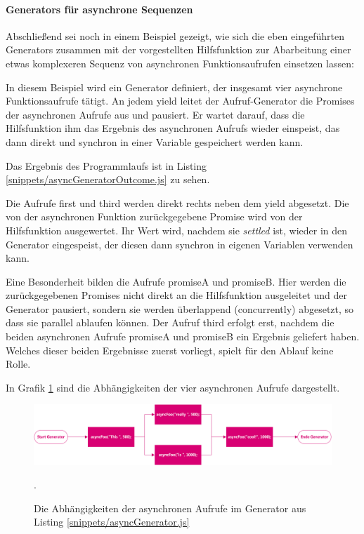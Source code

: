 \documentclass[
11pt, %
a4paper, %
oneside, %
pdfspacing, %
headinclude,
BCOR5mm, %
ngerman, %
bibtotocnumbered,
]{scrartcl}
\begin{document}
		\paragraph{Generators für asynchrone Sequenzen}
		
		Abschließend sei noch in einem Beispiel gezeigt, wie sich die eben eingeführten Generators zusammen mit der vorgestellten Hilfsfunktion zur Abarbeitung einer etwas komplexeren Sequenz von asynchronen Funktionsaufrufen einsetzen lassen:
		
		
		In diesem Beispiel wird ein Generator definiert, der insgesamt vier asynchrone Funktionsaufrufe tätigt. An jedem \textsf{yield} leitet der Aufruf-Generator die Promises der asynchronen Aufrufe aus und pausiert. Er wartet darauf, dass die Hilfsfunktion ihm das Ergebnis des asynchronen Aufrufs wieder einspeist, das dann direkt und synchron in einer Variable gespeichert werden kann. 
		
		Das Ergebnis des Programmlaufs ist in Listing \ref{snippets/asyncGeneratorOutcome.js} zu sehen.
		
		
		Die Aufrufe \textsf{first} und \textsf{third} werden direkt rechts neben dem \textsf{yield} abgesetzt. Die von der asynchronen Funktion zurückgegebene Promise wird von der Hilfsfunktion ausgewertet. Ihr Wert wird, nachdem sie \emph{settled} ist, wieder in den Generator eingespeist, der diesen dann synchron in eigenen Variablen verwenden kann.
		
		Eine Besonderheit bilden die Aufrufe \textsf{promiseA} und \textsf{promiseB}. Hier werden die zurückgegebenen Promises nicht direkt an die Hilfsfunktion ausgeleitet und der Generator pausiert, sondern sie werden überlappend (concurrently) abgesetzt, so dass sie parallel ablaufen können. Der Aufruf \textsf{third} erfolgt erst, nachdem die beiden asynchronen Aufrufe \textsf{promiseA} und \textsf{promiseB} ein Ergebnis geliefert haben. Welches dieser beiden Ergebnisse zuerst vorliegt, spielt für den Ablauf keine Rolle.
		
		In Grafik \ref{generatorFlow} sind die Abhängigkeiten der vier asynchronen Aufrufe dargestellt.
		
		\begin{figure}[h]\center
			\includegraphics[width=1.0 \textwidth]{Images/generatorFlow.png}
			\caption[Abhängigkeiten asynchroner Aufrufe im Generator]{\label{generatorFlow}Die Abhängigkeiten der asynchronen Aufrufe im Generator aus Listing {\ref{snippets/asyncGenerator.js}}}.
		\end{figure}
		
\end{document}
